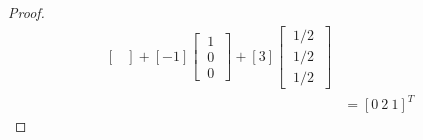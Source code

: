 \documentclass[../main.tex]{subfiles}
\begin{document}
\begin{proof}
\begin{align*}
\begin{bmatrix}
                \end{bmatrix} +
                [-1] \begin{bmatrix}
                        \ 1 \ \\
                        \ 0 \ \\
                        \ 0 \
                \end{bmatrix} +
                [3]\begin{bmatrix}
                        \ {1}/{2} \ \\
                        \ {1}/{2} \ \\
                        \ {1}/{2} \
                \end{bmatrix}                 \\
                 & = [0 \ 2 \ 1]^T
        \end{align*}
\end{proof}
\pagebreak
\end{document}
